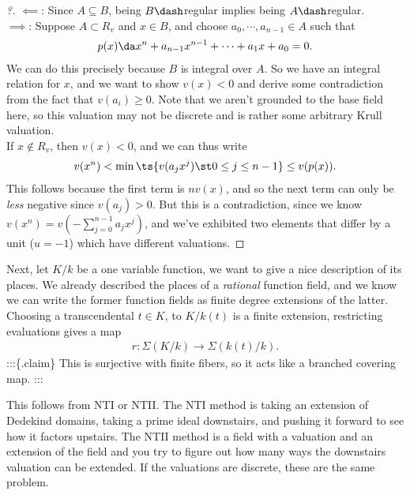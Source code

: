 \begin{proof}[?]

\(\impliedby\): Since \(A \subseteq B\), being \(B\dash\)regular implies
being \(A\dash\)regular.\\

\(\implies\): Suppose \(A \subset R_v\) and \(x\in B\), and choose
\(a_0, \cdots, a_{n-1} \in A\) such that
\begin{align*}  
p(x) \da x^n + a_{n-1}x^{n-1} + \cdots + a_1 x + a_0 = 0
.\end{align*} We can do this precisely because \(B\) is integral over
\(A\). So we have an integral relation for \(x\), and we want to show
\(v(x) < 0\) and derive some contradiction from the fact that
\(v(a_i) \geq 0\). Note that we aren't grounded to the base field here,
so this valuation may not be discrete and is rather some arbitrary Krull
valuation.\\

If \(x\not \in R_v\), then \(v(x) < 0\), and we can thus write
\begin{align*}  
v(x^n) < \min \ts{ v(a_j x^j) \st 0\leq j \leq n-1 } \leq v(p(x))
.\end{align*} This follows because the first term is \(nv(x)\), and so
the next term can only be \emph{less} negative since \(v(a_j) > 0\). But
this is a contradiction, since we know
\(v(x^n) = v(- \sum_{j=0}^{n-1} a_j x^j)\), and we've exhibited two
elements that differ by a unit (\(u=-1\)) which have different
valuations.

\end{proof}

Next, let \(K/k\) be a one variable function, we want to give a nice
description of its places. We already described the places of a
\emph{rational} function field, and we know we can write the former
function fields as finite degree extensions of the latter. Choosing a
transcendental \(t\in K\), to \(K/k(t)\) is a finite extension,
restricting evaluations gives a map
\begin{align*}  
r: \Sigma(K/k) \to \Sigma(k(t)/ k)
.\end{align*} :::\{.claim\} This is surjective with finite fibers, so it
acts like a branched covering map. :::

This follows from NTI or NTII. The NTI method is taking an extension of
Dedekind domains, taking a prime ideal downstairs, and pushing it
forward to see how it factors upstairs. The NTII method is a field with
a valuation and an extension of the field and you try to figure out how
many ways the downstairs valuation can be extended. If the valuations
are discrete, these are the same problem.

